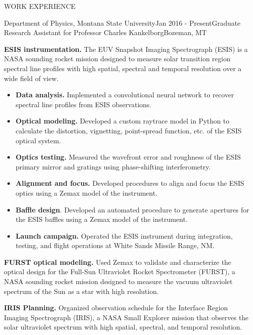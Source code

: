 \documentclass{resume} %
\begin{document}

\begin{rSection}{WORK EXPERIENCE}
\begin{rSubsection}{Department of Physics, Montana State University}{Jan 2016 - Present}{Graduate Research Assistant for Professor Charles Kankelborg}{Bozeman, MT}
	\small
	\item \textbf{ESIS instrumentation.} The EUV Snapshot Imaging Spectrograph (ESIS) is a NASA sounding rocket mission designed to measure solar transition region spectral line profiles with high spatial, spectral and temporal resolution over a wide field of view.
	\begin{itemize}[topsep=-5pt, noitemsep, leftmargin=*, label={--}]
		\item \textbf{Data analysis.} Implemented a convolutional neural network to recover spectral line profiles from ESIS observations.
		\item \textbf{Optical modeling.} Developed a custom raytrace model in Python to calculate the distortion, vignetting, point-spread function, etc. of the ESIS optical system.
		\item \textbf{Optics testing.} Measured the wavefront error and roughness of the ESIS primary mirror and gratings using phase-shifting interferometry. 
		\item \textbf{Alignment and focus.} Developed procedures to align and focus the ESIS optics using a Zemax model of the instrument.
		\item \textbf{Baffle design}. Developed an automated procedure to generate apertures for the ESIS baffles using a Zemax model of the instrument.
		\item \textbf{Launch campaign.} Operated the ESIS instrument during integration, testing, and flight operations at White Sands Missile Range, NM.
	\end{itemize}
	\item \textbf{FURST optical modeling.} Used Zemax to validate and characterize the optical design for the Full-Sun Ultraviolet Rocket Spectrometer (FURST), a NASA sounding rocket mission designed to measure the vacuum ultraviolet spectrum of the Sun as a star with high resolution.
	\item \textbf{IRIS Planning.} Organized observation schedule for the Interface Region Imaging Spectrograph (IRIS), a NASA Small Explorer mission that observes the solar ultraviolet spectrum with high spatial, spectral, and temporal resolution.
\end{rSubsection}



\end{rSection}
\end{document}
